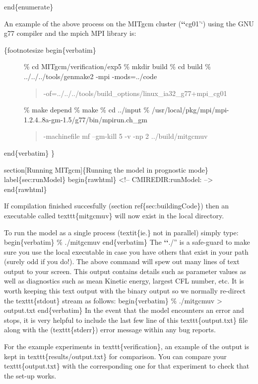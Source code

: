 \documentclass[letterpaper,10pt,english]{sphinxmanual}
\begin{document}
end\{enumerate\}

An example of the above process on the MITgcm cluster ({\color{red}\bfseries{}{}`{}`}cg01'`) using
the GNU g77 compiler and the mpich MPI library is:
\begin{description}
\item[{\{footnotesize begin\{verbatim\}}] \leavevmode
\%  cd MITgcm/verification/exp5
\%  mkdir build
\%  cd build
\%  ../../../tools/genmake2 -mpi -mods=../code 
\begin{quote}

-of=../../../tools/build\_options/linux\_ia32\_g77+mpi\_cg01
\end{quote}

\%  make depend
\%  make
\%  cd ../input
\%  /usr/local/pkg/mpi/mpi-1.2.4..8a-gm-1.5/g77/bin/mpirun.ch\_gm 
\begin{quote}

-machinefile mf --gm-kill 5 -v -np 2  ../build/mitgcmuv
\end{quote}

\end{description}

end\{verbatim\} \}

section{[}Running MITgcm{]}\{Running the model in prognostic mode\}
label\{sec:runModel\}
begin\{rawhtml\}
\textless{}!-- CMIREDIR:runModel: --\textgreater{}
end\{rawhtml\}

If compilation finished succesfully (section ref\{sec:buildingCode\})
then an executable called texttt\{mitgcmuv\} will now exist in the
local directory.

To run the model as a single process (textit\{ie.\} not in parallel)
simply type:
begin\{verbatim\}
\% ./mitgcmuv
end\{verbatim\}
The {\color{red}\bfseries{}{}`{}`}./'' is a safe-guard to make sure you use the local executable
in case you have others that exist in your path (surely odd if you
do!). The above command will spew out many lines of text output to
your screen.  This output contains details such as parameter values as
well as diagnostics such as mean Kinetic energy, largest CFL number,
etc. It is worth keeping this text output with the binary output so we
normally re-direct the texttt\{stdout\} stream as follows:
begin\{verbatim\}
\% ./mitgcmuv \textgreater{} output.txt
end\{verbatim\}
In the event that the model encounters an error and stops, it is very
helpful to include the last few line of this texttt\{output.txt\} file
along with the (texttt\{stderr\}) error message within any bug reports.

For the example experiments in texttt\{verification\}, an example of the
output is kept in texttt\{results/output.txt\} for comparison. You can
compare your texttt\{output.txt\} with the corresponding one for that
experiment to check that the set-up works.
\end{document}
